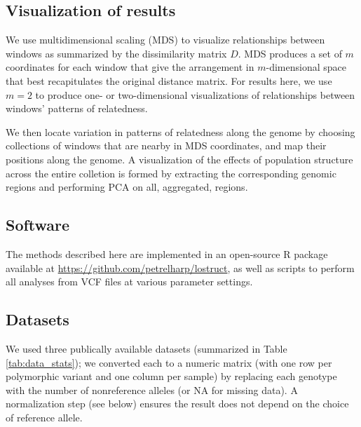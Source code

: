 \documentclass[11pt, oneside]{article}   	%
\begin{document}
\subsection{Visualization of results}

We use multidimensional scaling (MDS) to visualize relationships between windows
as summarized by the dissimilarity matrix $D$.
MDS produces a set of $m$ coordinates for each window that
give the arrangement in $m$-dimensional space that best recapitulates the original distance matrix.
For results here, we use $m=2$ to produce one- or two-dimensional visualizations of relationships between windows' patterns of relatedness.

We then locate variation in patterns of relatedness along the genome
by choosing collections of windows that are nearby in MDS coordinates,
and map their positions along the genome.
A visualization of the effects of population structure across the entire colletion is formed by extracting the corresponding genomic regions
and performing PCA on all, aggregated, regions.


\subsection{Software}

The methods described here
are implemented in an open-source R package
available at \url{https://github.com/petrelharp/lostruct},
as well as scripts to perform all analyses from VCF files
at various parameter settings.


\subsection{Datasets}

We used three publically available datasets (summarized in Table \ref{tab:data_stats});
we converted each to a numeric matrix
(with one row per polymorphic variant and one column per sample)
by replacing each genotype with the number of nonreference alleles
(or NA for missing data).
A normalization step (see below) ensures the result does not depend on the choice of reference allele.
\end{document}
